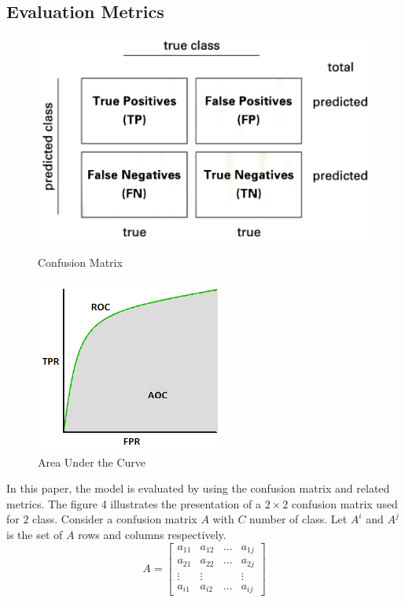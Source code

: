 \documentclass[sensors,article,submit,pdftex,moreauthors]{Definitions/mdpi}
\begin{document}
\subsection{Evaluation Metrics}
\begin{figure}[!htb]
	\begin{minipage}{0.48\textwidth}
		\centering
		\includegraphics[width=1.1\linewidth]{Definitions/Confusion-matrix}
		\caption{Confusion Matrix}\label{fig:confusion-matrix}
	\end{minipage}\hfill
	\begin{minipage}{0.48\textwidth}
		\centering
		\includegraphics[width=.7\linewidth]{Definitions/AUC}
		\caption{Area Under the Curve}\label{fig:AUC}
	\end{minipage}
\end{figure}
In this paper, the model is evaluated by using the confusion matrix and related metrics. The figure 4 illustrates the presentation of a $2 \times 2$ confusion matrix used for $2$ class. Consider a confusion matrix $A$ with $C$ number of class. Let $A^i$ and $A^j$ is the set of $A$ rows and columns respectively. 
\[
A = \begin{bmatrix}
	a_{11} & a_{12} & \dots & a_{1j} \\
	a_{21} & a_{22} & \dots & a_{2j} \\
	\vdots & \vdots	&  & \vdots\\
	a_{i1} & a_{i2} & \dots & a_{ij} 
\end{bmatrix}
\]
\end{document}
